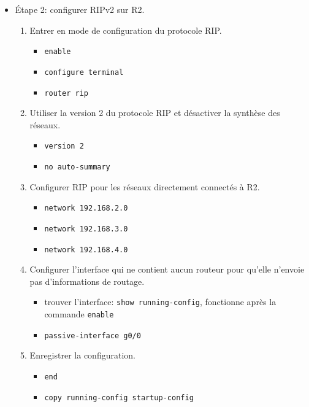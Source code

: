 \documentclass[a4paper]{article}
\begin{document}
\begin{itemize}
\item Étape 2: configurer RIPv2 sur R2.
\begin{enumerate}
    \item Entrer en mode de configuration du protocole RIP.
    \begin{example}
        \begin{itemize}
            \item \texttt{enable}
            \item \texttt{configure terminal}
            \item \texttt{router rip}
        \end{itemize}
    \end{example}
    \item Utiliser la version 2 du protocole RIP et désactiver la synthèse des réseaux.
    \begin{example}
        \begin{itemize}
            \item \texttt{version 2}
            \item \texttt{no auto-summary}
        \end{itemize}
    \end{example}
    \item Configurer RIP pour les réseaux directement connectés à R2.
    \begin{example}
        \begin{itemize}
            \item \texttt{network 192.168.2.0}
            \item \texttt{network 192.168.3.0}
            \item \texttt{network 192.168.4.0}
        \end{itemize}
    \end{example}
    \item Configurer l'interface qui ne contient aucun routeur pour qu'elle n'envoie pas d'informations de routage.
    \begin{example}
        \begin{itemize}
            \item trouver l'interface: \texttt{show running-config}, fonctionne après la commande \texttt{enable}
            \item \texttt{passive-interface g0/0}
        \end{itemize}
    \end{example}
    \item Enregistrer la configuration.
    \begin{example}
        \begin{itemize}
            \item \texttt{end}
            \item \texttt{copy running-config startup-config}
        \end{itemize}
    \end{example}
\end{enumerate}






\end{itemize}
\end{document}
